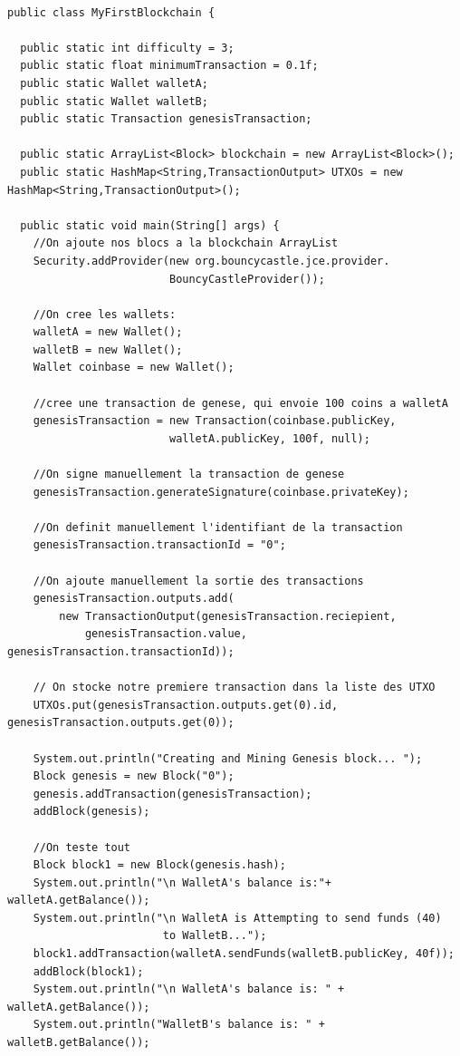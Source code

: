 \documentclass[12pt]{report}
\begin{document}
\begin{lstlisting}

public class MyFirstBlockchain {
	
  public static int difficulty = 3;
  public static float minimumTransaction = 0.1f;
  public static Wallet walletA;
  public static Wallet walletB;
  public static Transaction genesisTransaction;
  
  public static ArrayList<Block> blockchain = new ArrayList<Block>(); 
  public static HashMap<String,TransactionOutput> UTXOs = new HashMap<String,TransactionOutput>();

  public static void main(String[] args) {	
    //On ajoute nos blocs a la blockchain ArrayList
    Security.addProvider(new org.bouncycastle.jce.provider.
                         BouncyCastleProvider());
		
    //On cree les wallets:
    walletA = new Wallet();
    walletB = new Wallet();		
    Wallet coinbase = new Wallet();
		
    //cree une transaction de genese, qui envoie 100 coins a walletA
    genesisTransaction = new Transaction(coinbase.publicKey, 
                         walletA.publicKey, 100f, null);
                         
    //On signe manuellement la transaction de genese
    genesisTransaction.generateSignature(coinbase.privateKey);
    
    //On definit manuellement l'identifiant de la transaction
    genesisTransaction.transactionId = "0"; 
    
    //On ajoute manuellement la sortie des transactions
    genesisTransaction.outputs.add(
        new TransactionOutput(genesisTransaction.reciepient, 
            genesisTransaction.value, genesisTransaction.transactionId)); 
    
    // On stocke notre premiere transaction dans la liste des UTXO
    UTXOs.put(genesisTransaction.outputs.get(0).id, genesisTransaction.outputs.get(0)); 
		
    System.out.println("Creating and Mining Genesis block... ");
    Block genesis = new Block("0");
    genesis.addTransaction(genesisTransaction);
    addBlock(genesis);
		
    //On teste tout
    Block block1 = new Block(genesis.hash);
    System.out.println("\n WalletA's balance is:"+ walletA.getBalance());
    System.out.println("\n WalletA is Attempting to send funds (40) 
                        to WalletB...");
    block1.addTransaction(walletA.sendFunds(walletB.publicKey, 40f));
    addBlock(block1);
    System.out.println("\n WalletA's balance is: " + walletA.getBalance());
    System.out.println("WalletB's balance is: " + walletB.getBalance());
		

\end{lstlisting}
\end{document}

